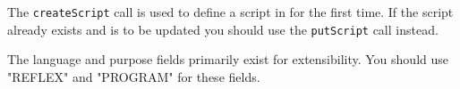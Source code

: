The \verb+createScript+ call is used to define a script in \Rapture for the first time. If the
script already exists and is to be updated you should use the \verb+putScript+ call instead.

The language and purpose fields primarily exist for extensibility. You should use "REFLEX" and "PROGRAM"
for these fields.
